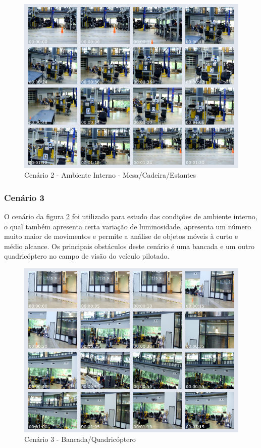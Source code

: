 \begin{figure}[H]
	\centering
	\includegraphics[scale=0.50]{./Resources/thumb_video12_l.png}
	\caption{Cenário 2 - Ambiente Interno - Mesa/Cadeira/Estantes}
	\label{thumb_video12_l}
\end{figure}


\subsubsection{Cenário 3}

O cenário da figura \ref{thumb_video15} foi utilizado para estudo das condições de ambiente interno, o qual também apresenta certa variação de luminosidade, apresenta um número muito maior de movimentos e permite a análise de objetos móveis à curto e médio alcance. Os principais obstáculos deste cenário  é uma bancada e um outro quadricóptero no campo de visão do veículo pilotado.

\begin{figure}[H]
	\centering
	\includegraphics[scale=0.50]{./Resources/thumb_video15.png}
	\caption{Cenário 3 - Bancada/Quadricóptero}
	\label{thumb_video15}
\end{figure}



